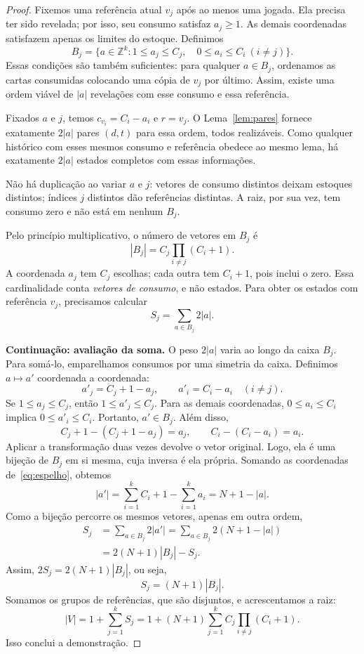 \documentclass[11pt,a4paper]{article}
\theoremstyle{definition}
\newcommand{\destaque}[1]{\par\smallskip\noindent\textbf{#1}\enspace}
\newcommand{\proxpagina}{\newpage}
\begin{document}
\begin{proof}
Fixemos uma referência atual $v_j$ após ao menos uma jogada. Ela precisa ter sido revelada; por isso, seu consumo satisfaz $a_j\ge1$. As demais coordenadas satisfazem apenas os limites do estoque. Definimos
\[
B_j=\bigl\{a\in\mathbb Z^k:1\le a_j\le C_j,\quad
0\le a_i\le C_i\ (i\ne j)\bigr\}.
\]
Essas condições são também suficientes: para qualquer $a\in B_j$, ordenamos as cartas consumidas colocando uma cópia de $v_j$ por último. Assim, existe uma ordem viável de $|a|$ revelações com esse consumo e essa referência.

Fixados $a$ e $j$, temos $c_{v_i}=C_i-a_i$ e $r=v_j$. O Lema~\ref{lem:pares} fornece exatamente $2|a|$ pares $(d,t)$ para essa ordem, todos realizáveis. Como qualquer histórico com esses mesmos consumo e referência obedece ao mesmo lema, há exatamente $2|a|$ estados completos com essas informações.

Não há duplicação ao variar $a$ e $j$: vetores de consumo distintos deixam estoques distintos; índices $j$ distintos dão referências distintas. A raiz, por sua vez, tem consumo zero e não está em nenhum $B_j$.

Pelo princípio multiplicativo, o número de vetores em $B_j$ é
\[
|B_j|=C_j\prod_{i\ne j}(C_i+1).
\]
A coordenada $a_j$ tem $C_j$ escolhas; cada outra tem $C_i+1$, pois inclui o zero. Essa cardinalidade conta \emph{vetores de consumo}, e não estados. Para obter os estados com referência $v_j$, precisamos calcular
\[
S_j=\sum_{a\in B_j}2|a|.
\]
\proxpagina
\destaque{Continuação: avaliação da soma.}
O peso $2|a|$ varia ao longo da caixa $B_j$. Para somá-lo, emparelhamos consumos por uma simetria da caixa. Definimos $a\mapsto a'$ coordenada a coordenada:
\begin{equation}\label{eq:espelho}
a'_j=C_j+1-a_j,\qquad a'_i=C_i-a_i\quad(i\ne j).
\end{equation}
Se $1\le a_j\le C_j$, então $1\le a'_j\le C_j$. Para as demais coordenadas, $0\le a_i\le C_i$ implica $0\le a'_i\le C_i$. Portanto, $a'\in B_j$. Além disso,
\[
C_j+1-(C_j+1-a_j)=a_j,\qquad C_i-(C_i-a_i)=a_i.
\]
Aplicar a transformação duas vezes devolve o vetor original. Logo, ela é uma bijeção de $B_j$ em si mesma, cuja inversa é ela própria. Somando as coordenadas de~\eqref{eq:espelho}, obtemos
\begin{equation}\label{eq:somasespelho}
|a'|=\sum_{i=1}^{k}C_i+1-\sum_{i=1}^{k}a_i=N+1-|a|.
\end{equation}
Como a bijeção percorre os mesmos vetores, apenas em outra ordem,
\begin{align*}
S_j&=\sum_{a\in B_j}2|a'|
=\sum_{a\in B_j}2(N+1-|a|)\\
&=2(N+1)|B_j|-S_j.
\end{align*}
Assim, $2S_j=2(N+1)|B_j|$, ou seja,
\[
S_j=(N+1)|B_j|.
\]
Somamos os grupos de referências, que são disjuntos, e acrescentamos a raiz:
\[
|V|=1+\sum_{j=1}^{k}S_j
=1+(N+1)\sum_{j=1}^{k}C_j\prod_{i\ne j}(C_i+1).
\]
Isso conclui a demonstração.
\end{proof}
\end{document}
